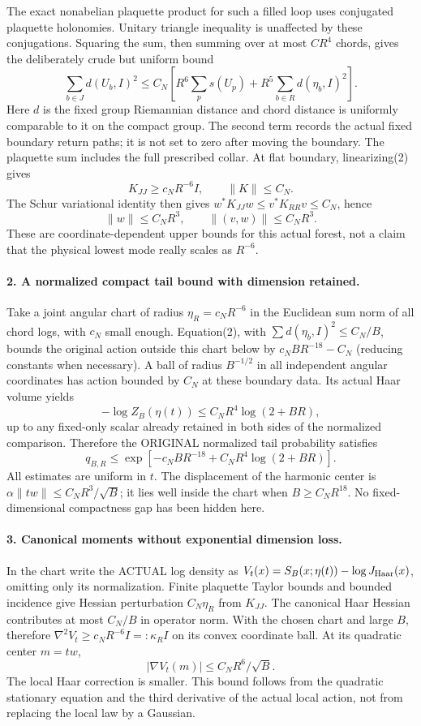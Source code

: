 \documentclass[11pt]{article}
\begin{document}
The exact nonabelian plaquette product for such a filled loop uses conjugated
plaquette holonomies. Unitary triangle inequality is unaffected by these
conjugations. Squaring the sum, then summing over at most $CR^4$ chords,
gives the deliberately crude but uniform bound
\[
 \sum_{b\in J}d(U_b,I)^2
 \le C_N\left[R^6\sum_p s(U_p)
             +R^5\sum_{b\in R}d(\eta_b,I)^2\right].                    \tag{2}
\]
Here $d$ is the fixed group Riemannian distance and chord distance is uniformly
comparable to it on the compact group. The second term records the actual
fixed boundary return paths; it is not set to zero after moving the boundary.
The plaquette sum includes the full prescribed collar. At flat boundary,
linearizing(2) gives
\[
 K_{JJ}\ge c_NR^{-6}I,\qquad \|K\|\le C_N.                             \tag{3}
\]
The Schur variational identity then gives
$w^*K_{JJ}w\le v^*K_{RR}v\le C_N$, hence
\[
 \|w\|\le C_NR^3,\qquad \|(v,w)\|\le C_NR^3.                           \tag{4}
\]
These are coordinate-dependent upper bounds for this actual forest, not a
claim that the physical lowest mode really scales as $R^{-6}$.

\paragraph{2. A normalized compact tail bound with dimension retained.}
Take a joint angular chart of radius $\eta_R=c_NR^{-6}$ in the Euclidean sum
norm of all chord logs, with $c_N$ small enough. Equation(2), with
$\sum d(\eta_b,I)^2\le C_N/B$, bounds the original action outside this chart
below by $c_NBR^{-18}-C_N$ (reducing constants when necessary).
A ball of radius $B^{-1/2}$ in all independent angular coordinates has action
bounded by $C_N$ at these boundary data. Its actual Haar volume yields
\[
 -\log Z_B(\eta(t))\le C_NR^4\log(2+BR),
\]
up to any fixed-only scalar already retained in both sides of the normalized
comparison. Therefore the ORIGINAL normalized tail probability satisfies
\[
 q_{B,R}\le \exp[-c_NBR^{-18}+C_NR^4\log(2+BR)].                         \tag{5}
\]
All estimates are uniform in $t$. The displacement of the harmonic center is
$\alpha\|tw\|\le C_NR^3/\sqrt B$; it lies well inside the chart when
$B\ge C_NR^{18}$. No fixed-dimensional compactness gap has been hidden here.

\paragraph{3. Canonical moments without exponential dimension loss.}
In the chart write the ACTUAL log density as
$V_t(x)=S_B(x;\eta(t))-\log J_{\rm Haar}(x)$, omitting only its normalization.
Finite plaquette Taylor bounds and bounded incidence give Hessian perturbation
$C_N\eta_R$ from $K_{JJ}$. The canonical Haar Hessian contributes at most
$C_N/B$ in operator norm. With the chosen chart and large $B$, therefore
$\nabla^2V_t\ge c_NR^{-6}I=:\kappa_R I$ on its convex coordinate ball.
At its quadratic center $m=tw$,
\[
 |\nabla V_t(m)|\le C_NR^6/\sqrt B.                                    \tag{6}
\]
The local Haar correction is smaller. This bound follows from the quadratic
stationary equation and the third derivative of the actual local action,
not from replacing the local law by a Gaussian.
\end{document}
